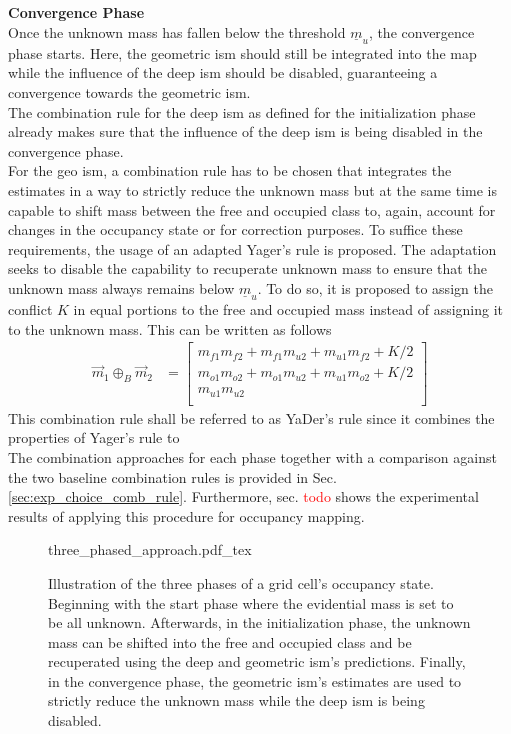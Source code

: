 \\
\\
\textbf{Convergence Phase}\\
Once the unknown mass has fallen below the threshold $\underline{m}_u$, the convergence phase starts. Here, the geometric \gls{ism} should still be integrated into the map while the influence of the deep \gls{ism} should be disabled, guaranteeing a convergence towards the geometric \gls{ism}.
\\
The combination rule for the deep \gls{ism} as defined for the initialization phase already makes sure that the influence of the deep \gls{ism} is being disabled in the convergence phase. 
\\
For the geo \gls{ism}, a combination rule has to be chosen that integrates the estimates in a way to strictly reduce the unknown mass but at the same time is capable to shift mass between the free and occupied class to, again, account for changes in the occupancy state or for correction purposes. To suffice these requirements, the usage of an adapted Yager's rule is proposed. The adaptation seeks to disable the capability to recuperate unknown mass to ensure that the unknown mass always remains below $\underline{m}_{u}$. To do so, it is proposed to assign the conflict $K$ in equal portions to the free and occupied mass instead of assigning it to the unknown mass. This can be written as follows
\begin{align}
	\label{eq:bauers_rule}
	\vec{m}_1 \oplus_B \vec{m}_2 &=  
	\begin{bmatrix} 
		m_{f1}m_{f2} + m_{f1}m_{u2} + m_{u1}m_{f2} + K/2\\
		m_{o1}m_{o2} + m_{o1}m_{u2} + m_{u1}m_{o2} + K/2\\
		m_{u1}m_{u2}\\
	\end{bmatrix}
\end{align}
This combination rule shall be referred to as YaDer's rule since it combines the properties of Yager's rule to  
\\
The combination approaches for each phase together with a comparison against the two baseline combination rules is provided in Sec. \ref{sec:exp_choice_comb_rule}. Furthermore, sec. \textcolor{red}{todo} shows the experimental results of applying this procedure for occupancy mapping.
\begin{figure}
	\begin{center}
		{three_phased_approach.pdf_tex}
		\caption{\label{fig:three_phased_approach}Illustration of the three phases of a grid cell's occupancy state. Beginning with the start phase where the evidential mass is set to be all unknown. Afterwards, in the initialization phase, the unknown mass can be shifted into the free and occupied class and be recuperated using the deep and geometric \gls{ism}'s predictions. Finally, in the convergence phase, the geometric \gls{ism}'s estimates are used to strictly reduce the unknown mass while the deep \gls{ism} is being disabled.}
	\end{center}
\end{figure}  



